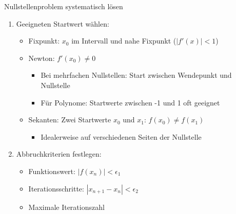 \begin{KR}{Nullstellenproblem systematisch lösen}
\begin{enumerate}
    \item Geeigneten Startwert wählen:
    \begin{itemize}
        \item Fixpunkt: $x_0$ im Intervall und nahe Fixpunkt ($|f'(x)| < 1$)
        \item Newton: $f'(x_0) \neq 0$
        \begin{itemize}
            \item Bei mehrfachen Nullstellen: Start zwischen Wendepunkt und Nullstelle
            \item Für Polynome: Startwerte zwischen -1 und 1 oft geeignet
        \end{itemize}
        \item Sekanten: Zwei Startwerte $x_0$ und $x_1$: $f(x_0) \neq f(x_1)$
        \begin{itemize}
            \item Idealerweise auf verschiedenen Seiten der Nullstelle
        \end{itemize}
    \end{itemize}
    
    \item Abbruchkriterien festlegen:
    \begin{itemize}
        \item Funktionswert: $|f(x_n)| < \epsilon_1$
        \item Iterationsschritte: $|x_{n+1}-x_n| < \epsilon_2$
        \item Maximale Iterationszahl
    \end{itemize}
\end{enumerate}
\end{KR}



